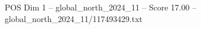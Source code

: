 \begin{textsample}{POS Dim 1 – global\_north\_2024\_11 – Score 17.00 – global\_north\_2024\_11/117493429.txt}
\end{textsample}

